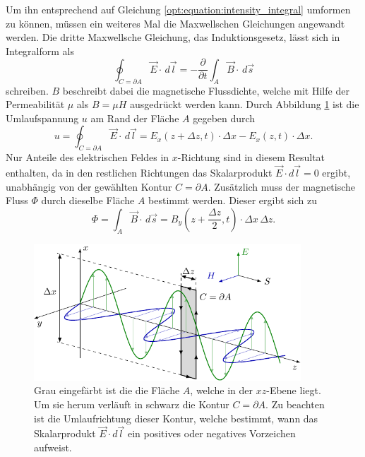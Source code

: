 Um ihn entsprechend auf Gleichung \eqref{opt:equation:intensity_integral} umformen zu können, müssen ein weiteres Mal die Maxwellschen Gleichungen angewandt werden.
Die dritte Maxwellsche Gleichung, das Induktionsgesetz, lässt sich in Integralform als
\begin{equation}
\oint_{C=\partial A} \vec{E} \cdot\, d\vec{l}
=
-\frac{\partial}{\partial t} \int_{A} \vec{B} \cdot\, d\vec{s}
\label{opt:equation:maxwell_3}
\end{equation}
schreiben.
$B$ beschreibt dabei die magnetische Flussdichte, welche mit Hilfe der Permeabilität $\mu$ als $B = \mu H$ ausgedrückt werden kann.
Durch Abbildung \ref{opt:fig:electromagnetic_wave_2} ist die Umlaufspannung $u$ am Rand der Fläche $A$ gegeben durch
\begin{equation}
u
=
\oint_{C=\partial A} \vec{E} \cdot\, d\vec{l}
=
E_x(z+\Delta z,t) \cdot \Delta x - E_x(z,t) \cdot \Delta x
.
\label{opt:equation:induced_voltage}
\end{equation}
Nur Anteile des elektrischen Feldes in $x$-Richtung sind in diesem Resultat enthalten, da in den restlichen Richtungen das Skalarprodukt $\vec{E} \cdot d\vec{l} = 0$ ergibt, unabhängig von der gewählten Kontur $C = \partial A$.
Zusätzlich muss der magnetische Fluss $\Phi$ durch dieselbe Fläche $A$ bestimmt werden.
Dieser ergibt sich zu
\begin{equation}
\Phi
=
\int_{A} \vec{B} \cdot\, d\vec{s}
=
B_y\left(z+\frac{\Delta z}{2},t\right) \cdot \Delta x \,\Delta z
.
\label{opt:equation:magnetic_flux}
\end{equation}

\begin{figure}
    \centering
    \includegraphics[width=100mm]{papers/opt/images/electromagnetic_wave_2.pdf}
    \caption{Grau eingefärbt ist die die Fläche $A$, welche in der $xz$-Ebene liegt.
    Um sie herum verläuft in schwarz die Kontur $C = \partial A$.
    Zu beachten ist die Umlaufrichtung dieser Kontur, welche bestimmt, wann das Skalarprodukt $\vec{E} \cdot d\vec{l}$ ein positives oder negatives Vorzeichen aufweist.}
    \label{opt:fig:electromagnetic_wave_2}
\end{figure}

